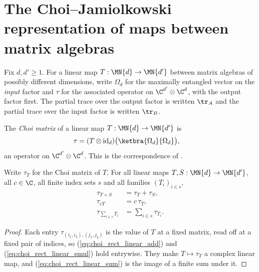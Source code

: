 \section{The Choi--Jamiolkowski representation of maps between matrix algebras}

Fix $d,d'\geq 1$. For a linear map $T:\MN{d}\to\MN{d'}$ between matrix
algebras of possibly different dimensions, write $\Omega_d$ for the maximally
entangled vector on the \emph{input} factor and $\tau$ for the associated
operator on $\C^{d'}\otimes\C^{d}$, with the output factor first. The partial
trace over the output factor is written $\tr_A$ and the partial trace over
the input factor is written $\tr_B$.

\begin{definition}
    \label{def:choi_matrix_rect}
    \leanok
    The \emph{Choi matrix} of a linear map $T:\MN{d}\to\MN{d'}$ is
    \begin{align}
        \tau &= (T\otimes\operatorname{id}_d)
          \bigl(\ketbra{\Omega_d}{\Omega_d}\bigr),
        \notag
    \end{align}
    an operator on $\C^{d'}\otimes\C^{d}$. This is the correspondence of
    \cite[Proposition~2.1]{Wolf2012Quantum}.
\end{definition}

\begin{lemma}
    \label{lem:choi_rect_linear}
    \leanok
    Write $\tau_T$ for the Choi matrix of $T$. For all linear maps
    $T,S:\MN{d}\to\MN{d'}$, all $c\in\C$, all finite index sets $s$ and all
    families $(T_i)_{i\in s}$,
    \begin{align}
        \tau_{T+S} &= \tau_T + \tau_S,
        \label{eq:choi_rect_linear_add}\\
        \tau_{cT} &= c\,\tau_T,
        \label{eq:choi_rect_linear_smul}\\
        \tau_{\sum_{i\in s}T_i} &= \sum_{i\in s}\tau_{T_i}.
        \label{eq:choi_rect_linear_sum}
    \end{align}
\end{lemma}

\begin{proof}
    \leanok
    Each entry $\tau_{(i_1,i_2),(j_1,j_2)}$ is the value of $T$ at a fixed
    matrix, read off at a fixed pair of indices, so
    (\ref{eq:choi_rect_linear_add}) and (\ref{eq:choi_rect_linear_smul}) hold
    entrywise. They make $T\mapsto\tau_T$ a complex linear map, and
    (\ref{eq:choi_rect_linear_sum}) is the image of a finite sum under it.
\end{proof}

